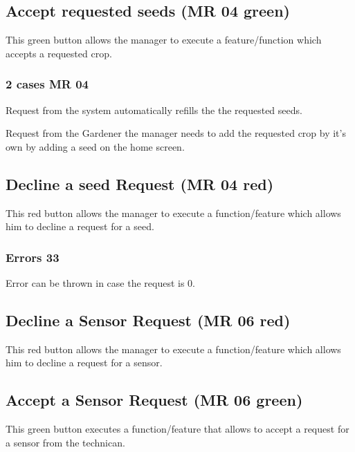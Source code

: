 \subsection{Accept requested seeds (MR 04 green)}
This green button allows the manager to execute a feature/function which accepts
a requested crop. 
\subsubsection{2 cases MR 04}
 
Request from the system automatically refills the the requested seeds.

Request from the Gardener the manager needs to add the requested crop by
it's own by adding a seed on the home screen.

\subsection{Decline a seed Request (MR 04 red)}
This red button allows the manager to execute a function/feature which allows
him to decline a request for a seed.

\subsubsection{Errors 33}
Error can be thrown in case the request is 0.


\subsection{Decline a Sensor Request (MR 06 red)}
This red button allows the manager to execute a function/feature which allows
him to decline a request for a sensor.
\subsection{Accept a Sensor Request (MR 06 green)}
This green button executes a function/feature that allows to accept a request
for a sensor from the technican.




